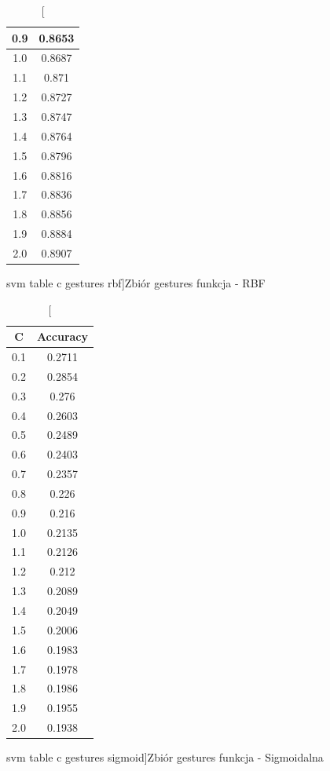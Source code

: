 \documentclass{classrep}
\begin{document}
{{\begin{table}[!htbp]
\begin{minipage}{.3\textwidth}
\begin{tabular}{|c|c|}
0.9 & 0.8653 \\ \hline
1.0 & 0.8687 \\ \hline
1.1 & 0.871 \\ \hline
1.2 & 0.8727 \\ \hline
1.3 & 0.8747 \\ \hline
1.4 & 0.8764 \\ \hline
1.5 & 0.8796 \\ \hline
1.6 & 0.8816 \\ \hline
1.7 & 0.8836 \\ \hline
1.8 & 0.8856 \\ \hline
1.9 & 0.8884 \\ \hline
2.0 & 0.8907 \\ \hline
        \end{tabular}
        \caption
		[svm table c gestures rbf]{Zbiór gestures funkcja - RBF}
        \label{{svm_table_c_gestures_rbf}}
    \end{minipage}
    \hfill
    \begin{minipage}{.3\textwidth}
        \centering
        \begin{tabular}{|c|c|}
            \hline
			C & Accuracy \\ \hline
			0.1 & 0.2711 \\ \hline
0.2 & 0.2854 \\ \hline
0.3 & 0.276 \\ \hline
0.4 & 0.2603 \\ \hline
0.5 & 0.2489 \\ \hline
0.6 & 0.2403 \\ \hline
0.7 & 0.2357 \\ \hline
0.8 & 0.226 \\ \hline
0.9 & 0.216 \\ \hline
1.0 & 0.2135 \\ \hline
1.1 & 0.2126 \\ \hline
1.2 & 0.212 \\ \hline
1.3 & 0.2089 \\ \hline
1.4 & 0.2049 \\ \hline
1.5 & 0.2006 \\ \hline
1.6 & 0.1983 \\ \hline
1.7 & 0.1978 \\ \hline
1.8 & 0.1986 \\ \hline
1.9 & 0.1955 \\ \hline
2.0 & 0.1938 \\ \hline
        \end{tabular}
        \caption
        [svm table c gestures sigmoid]{Zbiór gestures funkcja - Sigmoidalna}

\end{minipage}
\end{table}}}
\end{document}
